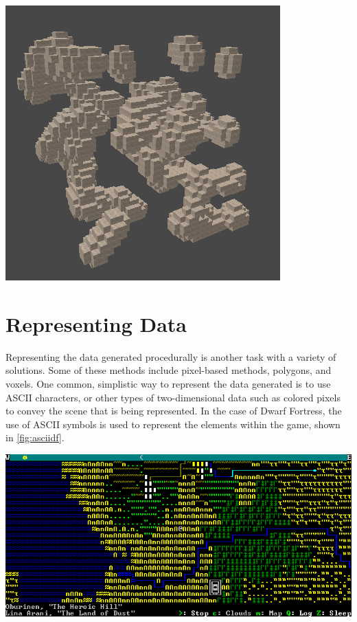 \documentclass[10pt]{report}
\begin{document}
		\begin{minipage}{\textwidth}
			\centering
			\includegraphics[scale=.75]{cellular-automata-cave}
			\label{fig:ca-cave}
		\end{minipage}
		
		\section{Representing Data}
	
		Representing the data generated procedurally is another task with a variety of solutions. Some of these methods include pixel-based methods, polygons, and voxels. One common, simplistic way to represent the data generated is to use ASCII characters, or other types of two-dimensional data such as colored pixels to convey the scene that is being represented. In the case of Dwarf Fortress, the use of ASCII symbols is used to represent the elements within the game, shown in \autoref{fig:asciidf}.
		
		\begin{minipage}{\textwidth}
			\centering
			\includegraphics[scale=.5]{dwarf_fortress}
			\label{fig:asciidf}
		\end{minipage}
		
\end{document}
